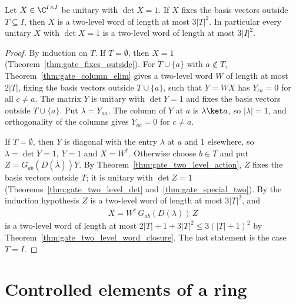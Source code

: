 \begin{theorem}
    \label{thm:gate_givens}
    \leanok
    Let $X\in\C^{I\times I}$ be unitary with $\det X=1$. If $X$ fixes the
    basis vectors outside $T\subseteq I$, then $X$ is a two-level word of
    length at most $3|T|^2$. In particular every unitary $X$ with
    $\det X=1$ is a two-level word of length at most $3|I|^2$.
\end{theorem}
\begin{proof}\leanok
    By induction on $T$. If $T=\emptyset$, then $X=1$
    (Theorem~\ref{thm:gate_fixes_outside}). For $T\cup\{a\}$ with
    $a\notin T$, Theorem~\ref{thm:gate_column_elim} gives a two-level word
    $W$ of length at most $2|T|$, fixing the basis vectors outside
    $T\cup\{a\}$, such that $Y=WX$ has $Y_{ca}=0$ for all $c\neq a$. The
    matrix $Y$ is unitary with $\det Y=1$ and fixes the basis vectors
    outside $T\cup\{a\}$. Put $\lambda=Y_{aa}$. The column of $Y$ at $a$ is
    $\lambda\ket a$, so $|\lambda|=1$, and orthogonality of the columns gives
    $Y_{ac}=0$ for $c\neq a$.

    If $T=\emptyset$, then $Y$ is diagonal with the entry $\lambda$ at $a$
    and $1$ elsewhere, so $\lambda=\det Y=1$, $Y=1$ and
    $X=W^\dagger$. Otherwise choose $b\in T$ and put
    $Z=G_{ab}(D(\overline\lambda))Y$. By
    Theorem~\ref{thm:gate_two_level_action}, $Z$ fixes the basis vectors
    outside $T$; it is unitary with $\det Z=1$
    (Theorems~\ref{thm:gate_two_level_det} and~\ref{thm:gate_special_two}).
    By the induction hypothesis $Z$ is a two-level word of length at most
    $3|T|^2$, and
    \begin{align}
        X=W^\dagger\,G_{ab}(D(\lambda))\,Z
    \end{align}
    is a two-level word of length at most
    $2|T|+1+3|T|^2\leq3(|T|+1)^2$ by
    Theorem~\ref{thm:gate_two_level_word_closure}. The last statement is the
    case $T=I$.
\end{proof}

\section{Controlled elements of a ring}
\label{sec:gate_controlled}

